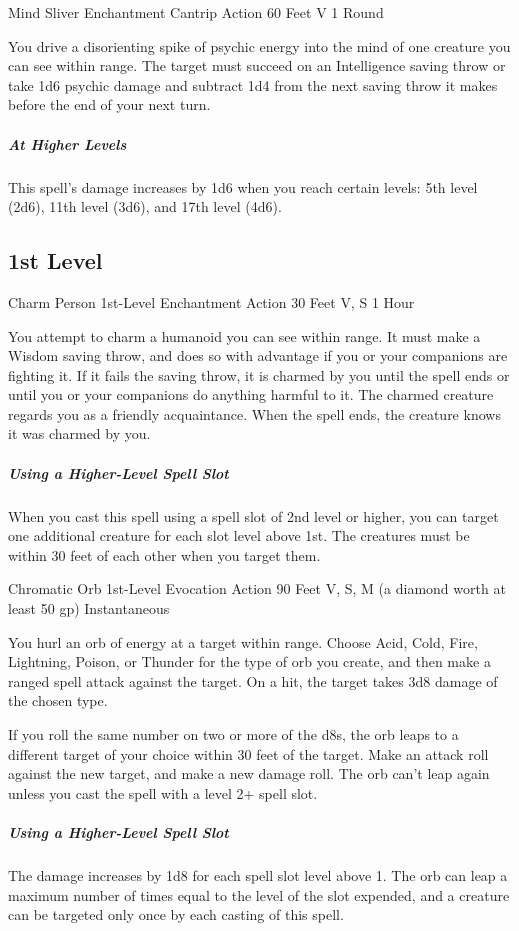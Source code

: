 \documentclass[letterpaper,openany,oneside,twocolumn]{book}
\begin{document}
\DndSpellHeader
  {Mind Sliver}
  {Enchantment Cantrip}
  {Action}
  {60 Feet}
  {V}
  {1 Round}

You drive a disorienting spike of psychic energy into the mind of one creature you can see within range. The target must succeed on an Intelligence saving throw or take 1d6 psychic damage and subtract 1d4 from the next saving throw it makes before the end of your next turn.

\subparagraph*{At Higher Levels} This spell's damage increases by 1d6 when you reach certain levels: 5th level (2d6), 11th level (3d6), and 17th level (4d6).

\subsection*{1st Level}

\DndSpellHeader
  {Charm Person}
  {1st-Level Enchantment}
  {Action}
  {30 Feet}
  {V, S}
  {1 Hour}

You attempt to charm a humanoid you can see within range. It must make a Wisdom saving throw, and does so with advantage if you or your companions are fighting it. If it fails the saving throw, it is charmed by you until the spell ends or until you or your companions do anything harmful to it. The charmed creature regards you as a friendly acquaintance. When the spell ends, the creature knows it was charmed by you.

\subparagraph*{Using a Higher-Level Spell Slot} When you cast this spell using a spell slot of 2nd level or higher, you can target one additional creature for each slot level above 1st. The creatures must be within 30 feet of each other when you target them.

\DndSpellHeader
  {Chromatic Orb}
  {1st-Level Evocation}
  {Action}
  {90 Feet}
  {V, S, M (a diamond worth at least 50 gp)}
  {Instantaneous}

You hurl an orb of energy at a target within range. Choose Acid, Cold, Fire, Lightning, Poison, or Thunder for the type of orb you create, and then make a ranged spell attack against the target. On a hit, the target takes 3d8 damage of the chosen type.

If you roll the same number on two or more of the d8s, the orb leaps to a different target of your choice within 30 feet of the target. Make an attack roll against the new target, and make a new damage roll. The orb can't leap again unless you cast the spell with a level 2+ spell slot.

\subparagraph*{Using a Higher-Level Spell Slot} The damage increases by 1d8 for each spell slot level above 1. The orb can leap a maximum number of times equal to the level of the slot expended, and a creature can be targeted only once by each casting of this spell.
\end{document}
